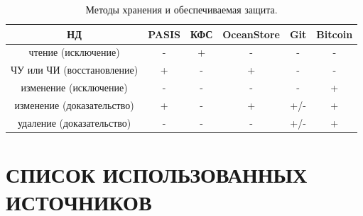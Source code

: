 \begin{table}[h]
    \begin{center}
        \label{tab:res}
        \caption{Методы хранения и обеспечиваемая защита.}
        \begin{tabular}{|c|c|c|c|c|c|}
            \hline
            \bfseries НД & \bfseries PASIS & \bfseries КФС & \bfseries OceanStore & \bfseries Git & \bfseries Bitcoin  \\
            \hline
            чтение (исключение) & - & + & - & - & - \\ \hline
            ЧУ или ЧИ (восстановление) & + & - & + & - & - \\ \hline
            изменение (исключение) & - & - & - & - & + \\ \hline
            изменение (доказательство) & + & - & + & +/- & + \\ \hline
            удаление (доказательство) & - & - & - & +/- & + \\ \hline
        \end{tabular}
    \end{center}
\end{table}

\clearpage

\section*{СПИСОК ИСПОЛЬЗОВАННЫХ ИСТОЧНИКОВ}

